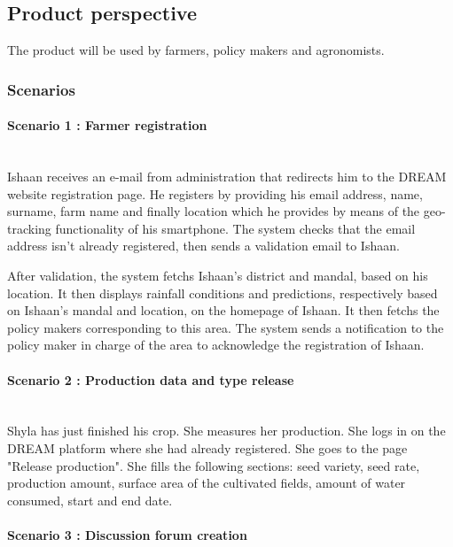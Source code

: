\subsection{Product perspective}
The product will be used by farmers, policy makers and agronomists.
\subsubsection{Scenarios}

\paragraph{Scenario 1 : Farmer registration}\mbox{} \\

Ishaan receives an e-mail from administration that redirects him to the DREAM website registration page. He registers by providing his email address, name, surname, farm name and finally location which he provides by means of the geo-tracking functionality of his smartphone. The system checks that the email address isn't already registered, then sends a validation email to Ishaan.

After validation, the system fetchs Ishaan's district and mandal, based on his location. It then displays rainfall conditions and predictions, respectively based on Ishaan's mandal and location, on the homepage of Ishaan. It then fetchs the policy makers corresponding to this area. The system sends a notification to the policy maker in charge of the area to acknowledge the registration of Ishaan.

\paragraph{Scenario 2 : Production data and type release}\mbox{} \\

Shyla has just finished his crop. She measures her production. She logs in on the DREAM platform where she had already registered. She goes to the page "Release production". She fills the following sections: seed variety, seed rate, production amount, surface area of the cultivated fields, amount of water consumed, start and end date.

\paragraph{Scenario 3 : Discussion forum creation}\mbox{} \\

